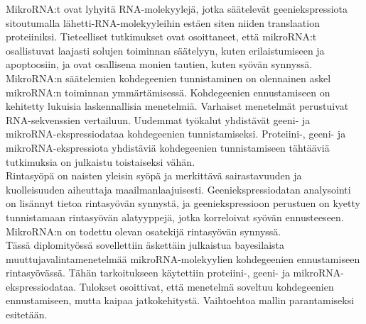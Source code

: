 \documentclass[english,12pt,a4paper,pdftex,elec,utf8]{aaltothesis}
\begin{document}
\newpage

\professorship{--}
\begin{abstractpage}[finnish]

MikroRNA:t ovat lyhyitä RNA-molekyylejä, jotka säätelevät geeniekspressiota
sitoutumalla lähetti-RNA-molekyyleihin estäen siten niiden translaation
proteiiniksi. Tieteelliset tutkimukset ovat osoittaneet, että mikroRNA:t
osallistuvat laajasti solujen toiminnan säätelyyn, kuten erilaistumiseen ja
apoptoosiin, ja ovat osallisena monien tautien, kuten syövän synnyssä. \\

MikroRNA:n säätelemien kohdegeenien tunnistaminen on olennainen
askel mikroRNA:n toiminnan ymmärtämisessä. Kohdegeenien
ennustamiseen on kehitetty lukuisia laskennallisia menetelmiä. Varhaiset
menetelmät perustuivat RNA-sekvenssien vertailuun. Uudemmat työkalut
yhdistävät geeni- ja mikroRNA-ekspressiodataa kohdegeenien tunnistamiseksi.
Proteiini-, geeni- ja mikroRNA-ekspressiota yhdistäviä
kohdegeenien tunnistamiseen tähtääviä tutkimuksia on julkaistu toistaiseksi vähän. \\

Rintasyöpä on naisten yleisin syöpä ja merkittävä sairastavuuden ja
kuolleisuuden aiheuttaja maailmanlaajuisesti. Geeniekspressiodatan analysointi
on lisännyt tietoa rintasyövän synnystä, ja geeniekspressioon perustuen on
kyetty tunnistamaan rintasyövän alatyyppejä, jotka korreloivat syövän
ennusteeseen. MikroRNA:n on todettu olevan osatekijä rintasyövän synnyssä. \\

Tässä diplomityössä sovellettiin äskettäin julkaistua bayesilaista
muuttujavalintamenetelmää mikroRNA-molekyylien kohdegeenien ennustamiseen
rintasyövässä. Tähän tarkoitukseen käytettiin proteiini-, geeni- ja mikroRNA-
ekspressiodataa. Tulokset osoittivat, että menetelmä soveltuu kohdegeenien
ennustamiseen, mutta kaipaa jatkokehitystä. Vaihtoehtoa mallin parantamiseksi
esitetään.

\end{abstractpage}
\end{document}
